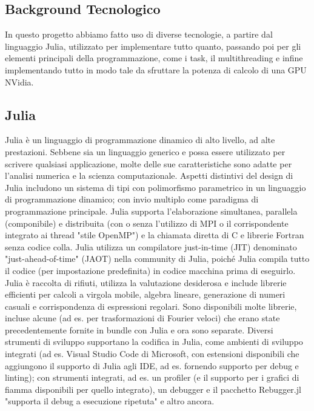\documentclass[a4paper]{extreport}
\begin{document}
\begin{multicols*}{2}
\chapter{Background Tecnologico}
In questo progetto abbiamo fatto uso di diverse tecnologie, a partire dal linguaggio Julia, utilizzato per implementare tutto quanto, passando poi per gli elementi principali della programmazione,
come i task, il multithreading e infine implementando tutto in modo tale da sfruttare la potenza di calcolo di una GPU NVidia.
\section{Julia}
Julia è un linguaggio di programmazione dinamico di alto livello, ad alte prestazioni. Sebbene sia un linguaggio generico e possa essere utilizzato per scrivere qualsiasi applicazione, molte delle sue caratteristiche sono adatte per l'analisi numerica e la scienza computazionale.
Aspetti distintivi del design di Julia includono un sistema di tipi con polimorfismo parametrico in un linguaggio di programmazione dinamico; con invio multiplo come paradigma di programmazione principale. Julia supporta l'elaborazione simultanea, parallela (componibile) e distribuita (con o senza l'utilizzo di MPI o il corrispondente integrato ai thread "stile OpenMP") e la chiamata diretta di C e librerie Fortran senza codice colla. Julia utilizza un compilatore just-in-time (JIT) denominato "just-ahead-of-time" (JAOT) nella community di Julia, poiché Julia compila tutto il codice (per impostazione predefinita) in codice macchina prima di eseguirlo.
Julia è raccolta di rifiuti, utilizza la valutazione desiderosa e include librerie efficienti per calcoli a virgola mobile, algebra lineare, generazione di numeri casuali e corrispondenza di espressioni regolari. Sono disponibili molte librerie, incluse alcune (ad es. per trasformazioni di Fourier veloci) che erano state precedentemente fornite in bundle con Julia e ora sono separate.
Diversi strumenti di sviluppo supportano la codifica in Julia, come ambienti di sviluppo integrati (ad es. Visual Studio Code di Microsoft, con estensioni disponibili che aggiungono il supporto di Julia agli IDE, ad es. fornendo supporto per debug e linting); con strumenti integrati, ad es. un profiler (e il supporto per i grafici di fiamma disponibili per quello integrato), un debugger e il pacchetto Rebugger.jl "supporta il debug a esecuzione ripetuta" e altro ancora.

\end{multicols*}
\end{document}
